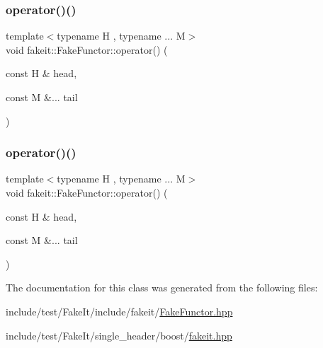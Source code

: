 \subsubsection{\texorpdfstring{operator()()}{operator()()}\hspace{0.1cm}{\footnotesize\ttfamily [8/9]}}
{\footnotesize\ttfamily template$<$typename H , typename ... M$>$ \\
void fakeit\+::\+Fake\+Functor\+::operator() (\begin{DoxyParamCaption}\item[{const H \&}]{head,  }\item[{const M \&...}]{tail }\end{DoxyParamCaption})\hspace{0.3cm}{\ttfamily [inline]}}

\mbox{\label{classfakeit_1_1FakeFunctor_a67158c932fcb480a393e4e6f08af17f1}} 
\subsubsection{\texorpdfstring{operator()()}{operator()()}\hspace{0.1cm}{\footnotesize\ttfamily [9/9]}}
{\footnotesize\ttfamily template$<$typename H , typename ... M$>$ \\
void fakeit\+::\+Fake\+Functor\+::operator() (\begin{DoxyParamCaption}\item[{const H \&}]{head,  }\item[{const M \&...}]{tail }\end{DoxyParamCaption})\hspace{0.3cm}{\ttfamily [inline]}}



The documentation for this class was generated from the following files\+:\begin{DoxyCompactItemize}
\item 
include/test/\+Fake\+It/include/fakeit/\mbox{\hyperlink{FakeFunctor_8hpp}{Fake\+Functor.\+hpp}}\item 
include/test/\+Fake\+It/single\+\_\+header/boost/\mbox{\hyperlink{single__header_2boost_2fakeit_8hpp}{fakeit.\+hpp}}\end{DoxyCompactItemize}
